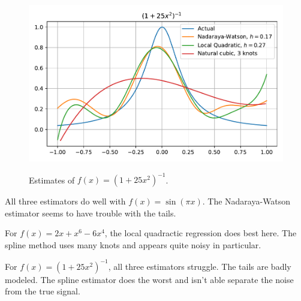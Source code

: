 \documentclass[letterpaper]{article}
\begin{document}
\begin{enumerate}[(a)]
  \begin{figure}
    \centering
    \includegraphics{regression_inv.pdf}
    \label{fig:regression_inv}
    \caption{Estimates of $f(x) = \left(1 + 25x^2\right)^{-1}$.}
  \end{figure}

  All three estimators do well with $f(x) = \sin\left(\pi x\right)$. The
  Nadaraya-Watson estimator seems to have trouble with the tails.

  For $f(x) = 2x + x^6 - 6x^4$, the local quadractic regression does best
  here. The spline method uses many knots and appears quite noisy in particular.

  For $f(x) = \left(1 + 25x^2\right)^{-1}$, all three estimators struggle. The
  tails are badly modeled. The spline estimator does the worst and isn't able
  separate the noise from the true signal.
\end{enumerate}
\end{document}
